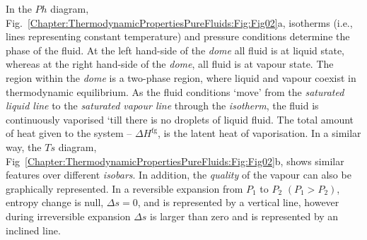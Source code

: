            In the $Ph$ diagram, Fig.~\ref{Chapter:ThermodynamicPropertiesPureFluids:Fig:Fig02}a, isotherms (i.e., lines representing constant temperature) and pressure conditions determine the phase of the fluid. At the left hand-side of the {\it dome} all fluid is at liquid state, whereas at the right hand-side of the {\it dome}, all fluid is at vapour state. The region within the {\it dome} is a two-phase region, where liquid and vapour coexist in thermodynamic equilibrium. As the fluid conditions `move' from the {\it saturated liquid line} to the {\it saturated vapour line} through the {\it isotherm}, the fluid is continuously vaporised `till there is no droplets of liquid fluid. The total amount of heat given to the system -- $\Delta H^{\text{fg}}$, is the latent heat of vaporisation. In a similar way, the $Ts$ diagram, Fig~\ref{Chapter:ThermodynamicPropertiesPureFluids:Fig:Fig02}b, shows similar features over different {\it isobars}. In addition, the {\it quality} of the vapour can also be graphically represented. In a reversible expansion from $P_{1}$ to $P_{2}$ $\left(P_{1}>P_{2}\right)$, entropy change is null, $\Delta s=0$, and is represented by a vertical line, however during irreversible expansion $\Delta s$ is larger than zero and is represented by an inclined line.

